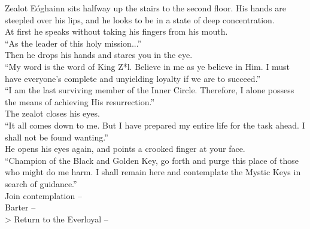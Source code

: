 Zealot Eóghainn sits halfway up the stairs to the second floor. His hands are steepled over his lips, and he looks to be in a state of deep concentration.\\

At first he speaks without taking his fingers from his mouth.\\
“As the leader of this holy mission...”\\

Then he drops his hands and stares you in the eye.\\
“My word is the word of King Z*l. Believe in me as ye believe in Him. I must have everyone’s complete and unyielding loyalty if we are to succeed.”\\

“I am the last surviving member of the Inner Circle. Therefore, I alone possess the means of achieving His resurrection.”\\

The zealot closes his eyes.\\
“It all comes down to me. But I have prepared my entire life for the task ahead. I shall not be found wanting.”\\

He opens his eyes again, and points a crooked finger at your face.\\
“Champion of the Black and Golden Key, go forth and purge this place of those who might do me harm. I shall remain here and contemplate the Mystic Keys in search of guidance.”\\

 Join contemplation -- \\
 Barter -- \\
> Return to the Everloyal -- 